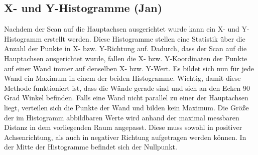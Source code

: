 \subsection{X- und Y-Histogramme (Jan)}

Nachdem der Scan auf die Hauptachsen ausgerichtet wurde kann ein X- und Y-Histogramm erstellt werden. Diese Histogramme stellen eine Statistik über die Anzahl der Punkte in X- bzw. Y-Richtung auf.
Dadurch, dass der Scan auf die Hauptachsen ausgerichtet wurde, fallen die X- bzw. Y-Koordinaten der Punkte auf einer Wand immer auf denselben X- bzw. Y-Wert. Es bildet sich nun für jede Wand ein Maximum in einem der beiden Histogramme. Wichtig, damit diese Methode funktioniert ist, dass die Wände gerade sind und sich an den Ecken 90 Grad Winkel befinden. Falls eine Wand nicht parallel zu einer der Hauptachsen liegt, verteilen sich die Punkte der Wand und bilden kein Maximum. Die Größe der im Histogramm abbildbaren Werte wird anhand der maximal messbaren Distanz in dem vorliegenden Raum angepasst. Diese muss sowohl in positiver Achsenrichtung, als auch in negativer Richtung aufgetragen werden können. In der Mitte der Histogramme befindet sich der Nullpunkt.

